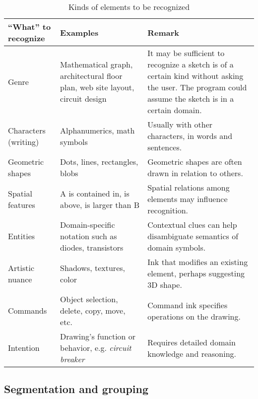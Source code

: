 \begin{landscape}
\begin{table}
\begin{tabular}{ p{4cm} | p{4.5cm} | p{5.5cm} }
\textbf{``What'' to recognize} & 
\textbf{Examples} & 
\textbf{Remark} \\ 
\hline \hline

Genre &
Mathematical graph, architectural floor plan, web site layout, circuit design &

It may be sufficient to recognize a sketch is of a certain kind
without asking the user. The program could assume the sketch is
in a certain domain.\\ \hline

Characters (writing) & 
Alphanumerics, math symbols & 
Usually with other characters, in words and sentences. \\ \hline

Geometric shapes & 
Dots, lines, rectangles, blobs &
Geometric shapes are often drawn in relation to others. \\ \hline

Spatial features &
A is contained in, is above, is larger than B &
Spatial relations among elements may influence recognition. \\ \hline

Entities &
Domain-specific notation such as diodes, transistors &
Contextual clues can help disambiguate semantics of domain symbols. \\ \hline

Artistic nuance &
Shadows, textures, color &
Ink that modifies an existing element, perhaps suggesting 3D shape. \\ \hline

Commands &
Object selection, delete, copy, move, etc. &
Command ink specifies operations on the drawing. \\ \hline

Intention &
Drawing's function or behavior, e.g. \textit{circuit breaker} & 
Requires detailed domain knowledge and reasoning. \\ \hline

\end{tabular}
\caption{Kinds of elements to be recognized}
\label{tab:what}
\end{table}
\end{landscape}


\subsection{Segmentation and grouping}
\label{sec:recognition-segmentation}

